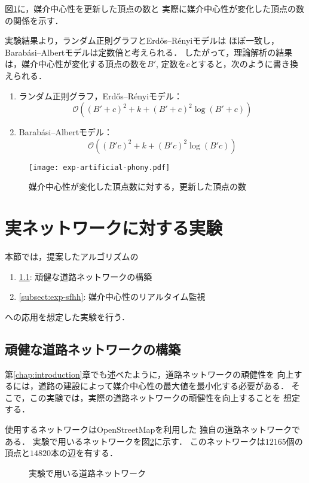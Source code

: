 図\ref{fig:exp-artificial-phony}に，媒介中心性を更新した頂点の数と
実際に媒介中心性が変化した頂点の数の関係を示す．

実験結果より，ランダム正則グラフとErd\H{o}s--R\'{e}nyiモデルは
ほぼ一致し，Barab\'{a}si--Albertモデルは定数倍と考えられる．
したがって，理論解析の結果は，媒介中心性が変化する頂点の数を$B'$,
定数を$c$とすると，次のように書き換えられる．
\begin{enumerate}
\item[] ランダム正則グラフ，Erd\H{o}s--R\'{e}nyiモデル：
  \[ \mathcal{O}((B'+c)^2+k+(B'+c)^2\log(B'+c)) \]
\item[] Barab\'{a}si--Albertモデル：
  \[ \mathcal{O}((B'c)^2+k+(B'c)^2\log(B'c)) \]
\end{enumerate}

\begin{figure}[tb]
  \centering
  \texttt{[image: exp-artificial-phony.pdf]}
  \caption{媒介中心性が変化した頂点数に対する，更新した頂点の数}
  \label{fig:exp-artificial-phony}
\end{figure}

\section{実ネットワークに対する実験}
\label{sect:exp-realnet}

本節では，提案したアルゴリズムの
\begin{enumerate}
\item[]\ref{subsect:exp-road}: 頑健な道路ネットワークの構築
\item[]\ref{subsect:exp-sfhh}: 媒介中心性のリアルタイム監視
\end{enumerate}
への応用を想定した実験を行う．

\subsection{頑健な道路ネットワークの構築}
\label{subsect:exp-road}

第\ref{chap:introduction}章でも述べたように，道路ネットワークの頑健性を
向上するには，道路の建設によって媒介中心性の最大値を最小化する必要がある．
そこで，この実験では，実際の道路ネットワークの頑健性を向上することを
想定する．

使用するネットワークはOpenStreetMap\cite{OpenStreetMap}を利用した
独自の道路ネットワークである．
実験で用いるネットワークを図\ref{fig:road-okayama}に示す．
このネットワークは$12165$個の頂点と$14820$本の辺を有する．
\begin{figure}[tb]
  \centering
  \caption{実験で用いる道路ネットワーク}
  \label{fig:road-okayama}
\end{figure}

